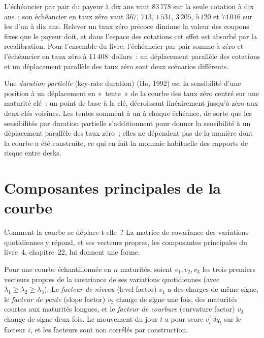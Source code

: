 \begin{example}\label{ex:rc:rates-risk:twoladders}
L'échéancier par pair du payeur à dix ans vaut $83\,778$ sur la seule cotation à dix ans~; son
échéancier en taux zéro vaut $367$, $713$, $1\,531$, $3\,205$, $5\,120$ et $74\,016$ sur les
 d'un à dix ans. Relever un taux zéro précoce diminue la valeur des coupons fixes que
le payeur doit, et dans l'espace des cotations cet effet est absorbé par la recalibration. Pour
l'ensemble du livre, l'échéancier par pair somme à zéro et l'échéancier en taux zéro à
11\,408~dollars~: un déplacement parallèle des cotations et un déplacement parallèle des taux zéro
sont deux scénarios différents.
\end{example}

\begin{definition}\label{def:rc:rates-risk:krd}
Une \emph{duration partielle} (key-rate duration) (Ho, 1992) est la
sensibilité d'une position à un déplacement en «~tente~» de la courbe des taux zéro
centré sur une maturité clé~: un point de base à la clé, décroissant linéairement
jusqu'à zéro aux deux clés voisines. Les tentes somment à un à chaque échéance, de
sorte que les sensibilités par duration partielle s'additionnent pour donner la
sensibilité à un déplacement parallèle des taux zéro~; elles ne dépendent pas de la
manière dont la courbe a été construite, ce qui en fait la monnaie habituelle des rapports de risque entre desks.
\end{definition}

\section{Composantes principales de la courbe}

Comment la courbe se déplace-t-elle~? La matrice de covariance des variations
quotidiennes y répond, et ses vecteurs propres, les composantes principales du livre~4,
chapitre~22, lui donnent une forme.

\begin{definition}\label{def:rc:rates-risk:factors}
Pour une courbe échantillonnée en $n$ maturités, soient $v_1, v_2, v_3$ les trois
premiers vecteurs propres de la covariance de ses variations quotidiennes (avec $\lambda_1\ge
\lambda_2\ge\lambda_3$). Le \emph{facteur de niveau} (level factor) $v_1$ a des
charges de même signe, le \emph{facteur de pente} (slope factor) $v_2$
change de signe une fois, des maturités courtes aux maturités longues, et le \emph{facteur de
courbure} (curvature factor) $v_3$ change de signe deux fois. Le mouvement du jour $t$ a
pour score $v_i^\top\delta q_t$ sur le facteur $i$, et les facteurs sont non corrélés
par construction.
\end{definition}

